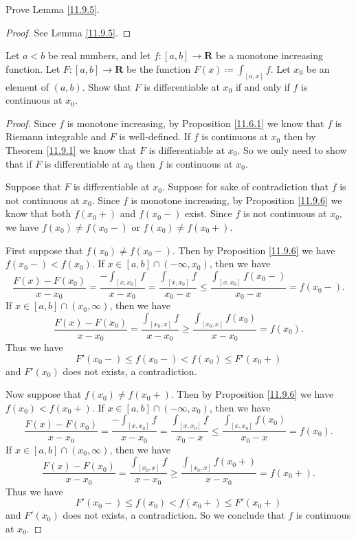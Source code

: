 \begin{exercise}\label{ex 11.9.2}
    Prove Lemma \ref{11.9.5}.
\end{exercise}

\begin{proof}
    See Lemma \ref{11.9.5}.
\end{proof}

\begin{exercise}\label{ex 11.9.3}
    Let \(a < b\) be real numbers, and let \(f : [a, b] \to \mathbf{R}\) be a monotone increasing function.
    Let \(F : [a, b] \to \mathbf{R}\) be the function \(F(x) \coloneqq \int_{[a, x]} f\).
    Let \(x_0\) be an element of \((a, b)\).
    Show that \(F\) is differentiable at \(x_0\) if and only if \(f\) is continuous at \(x_0\).
\end{exercise}

\begin{proof}
    Since \(f\) is monotone increasing, by Proposition \ref{11.6.1} we know that \(f\) is Riemann integrable and \(F\) is well-defined.
    If \(f\) is continuous at \(x_0\) then by Theorem \ref{11.9.1} we know that \(F\) is differentiable at \(x_0\).
    So we only need to show that if \(F\) is differentiable at \(x_0\) then \(f\) is continuous at \(x_0\).

    Suppose that \(F\) is differentiable at \(x_0\).
    Suppose for sake of contradiction that \(f\) is not continuous at \(x_0\).
    Since \(f\) is monotone increasing, by Proposition \ref{11.9.6} we know that both \(f(x_0+)\) and \(f(x_0-)\) exist.
    Since \(f\) is not continuous at \(x_0\), we have \(f(x_0) \neq f(x_0-)\) or \(f(x_0) \neq f(x_0+)\).

    First suppose that \(f(x_0) \neq f(x_0-)\).
    Then by Proposition \ref{11.9.6} we have \(f(x_0-) < f(x_0)\).
    If \(x \in [a, b] \cap (-\infty, x_0)\), then we have
    \[
        \frac{F(x) - F(x_0)}{x - x_0} = \frac{-\int_{[x, x_0]} f}{x - x_0} = \frac{\int_{[x, x_0]} f}{x_0 - x} \leq \frac{\int_{[x, x_0]} f(x_0-)}{x_0 - x} = f(x_0-).
    \]
    If \(x \in [a, b] \cap (x_0, \infty)\), then we have
    \[
        \frac{F(x) - F(x_0)}{x - x_0} = \frac{\int_{[x_0, x]} f}{x - x_0} \geq \frac{\int_{[x_0, x]} f(x_0)}{x - x_0} = f(x_0).
    \]
    Thus we have
    \[
        F'(x_0-) \leq f(x_0-) < f(x_0) \leq F'(x_0+)
    \]
    and \(F'(x_0)\) does not exists, a contradiction.

    Now suppose that \(f(x_0) \neq f(x_0+)\).
    Then by Proposition \ref{11.9.6} we have \(f(x_0) < f(x_0+)\).
    If \(x \in [a, b] \cap (-\infty, x_0)\), then we have
    \[
        \frac{F(x) - F(x_0)}{x - x_0} = \frac{-\int_{[x, x_0]} f}{x - x_0} = \frac{\int_{[x, x_0]} f}{x_0 - x} \leq \frac{\int_{[x, x_0]} f(x_0)}{x_0 - x} = f(x_0).
    \]
    If \(x \in [a, b] \cap (x_0, \infty)\), then we have
    \[
        \frac{F(x) - F(x_0)}{x - x_0} = \frac{\int_{[x_0, x]} f}{x - x_0} \geq \frac{\int_{[x_0, x]} f(x_0+)}{x - x_0} = f(x_0+).
    \]
    Thus we have
    \[
        F'(x_0-) \leq f(x_0) < f(x_0+) \leq F'(x_0+)
    \]
    and \(F'(x_0)\) does not exists, a contradiction.
    So we conclude that \(f\) is continuous at \(x_0\).
\end{proof}